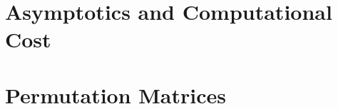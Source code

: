 \documentclass[12pt,a4paper]{book}
\theoremstyle{definition}
\begin{document}
\appendix

\chapter{Asymptotics and Computational Cost}


\chapter{Permutation Matrices}

\end{document}
